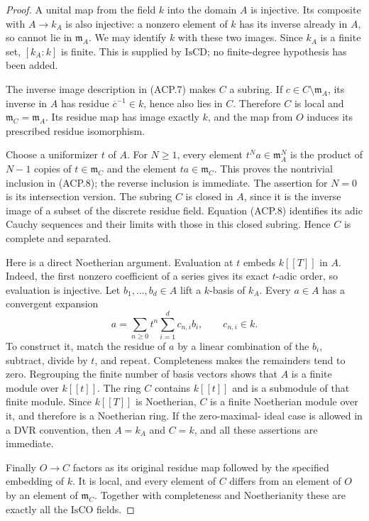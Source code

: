 \begin{proof}
A unital map from the field \(k\) into the domain \(A\) is
injective.  Its composite with \(A\to k_A\) is also injective:
a nonzero element of \(k\) has its inverse already in \(A\),
so cannot lie in \(\mathfrak m_A\).  We may identify \(k\)
with these two images.  Since \(k_A\) is a finite set,
\([k_A:k]\) is finite.  This is supplied by \(\mathrm{IsCD}\);
no finite-degree hypothesis has been added.

The inverse image description in (ACP.7) makes \(C\) a subring.
If \(c\in C\setminus\mathfrak m_A\), its inverse in \(A\)
has residue \(\overline c^{-1}\in k\), hence also lies in \(C\).
Therefore \(C\) is local and \(\mathfrak m_C=\mathfrak m_A\).
Its residue map has image exactly \(k\), and the map from \(O\)
induces its prescribed residue isomorphism.

Choose a uniformizer \(t\) of \(A\).  For \(N\ge1\), every
element \(t^Na\in\mathfrak m_A^N\) is the product of \(N-1\)
copies of \(t\in\mathfrak m_C\) and the element
\(ta\in\mathfrak m_C\).  This proves the nontrivial inclusion
in (ACP.8); the reverse inclusion is immediate.  The assertion
for \(N=0\) is its intersection version.  The subring \(C\) is
closed in \(A\), since it is the inverse image of a subset of the
discrete residue field.  Equation (ACP.8) identifies its adic
Cauchy sequences and their limits with those in this closed
subring.  Hence \(C\) is complete and separated.

Here is a direct Noetherian argument.  Evaluation at \(t\) embeds
\(k[[T]]\) in \(A\).  Indeed, the first nonzero coefficient of
a series gives its exact \(t\)-adic order, so evaluation is
injective.  Let \(b_1,\ldots,b_d\in A\) lift a \(k\)-basis of
\(k_A\).  Every \(a\in A\) has a convergent expansion
\[
 a=\sum_{n\ge0}t^n\sum_{i=1}^d c_{n,i}b_i,
 \qquad c_{n,i}\in k.
                                                        \tag{ACP.9}
\]
To construct it, match the residue of \(a\) by a linear
combination of the \(b_i\), subtract, divide by \(t\), and
repeat.  Completeness makes the remainders tend to zero.
Regrouping the finite number of basis vectors shows that \(A\)
is a finite module over \(k[[t]]\).  The ring \(C\) contains
\(k[[t]]\) and is a submodule of that finite module.  Since
\(k[[T]]\) is Noetherian, \(C\) is a finite Noetherian module
over it, and therefore is a Noetherian ring.  If the zero-maximal-
ideal case is allowed in a DVR convention, then \(A=k_A\) and
\(C=k\), and all these assertions are immediate.

Finally \(O\to C\) factors as its original residue map followed
by the specified embedding of \(k\).  It is local, and every
element of \(C\) differs from an element of \(O\) by an element
of \(\mathfrak m_C\).  Together with completeness and
Noetherianity these are exactly all the \(\mathrm{IsCO}\) fields.
\end{proof}

